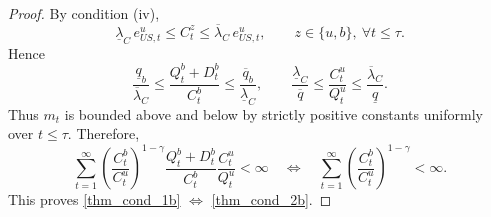 \documentclass[12pt]{article}
\theoremstyle{plain}
\begin{document}
\begin{proof}
By condition (iv),
\[
\underline\lambda_C\,e_{US,t}^u
\le
C_t^z
\le
\overline\lambda_C\,e_{US,t}^u,
\qquad z\in\{u,b\},\ \forall t\le\tau.
\]
Hence
\[
\frac{\underline q_b}{\overline\lambda_C}
\le
\frac{Q_t^b+D_t^b}{C_t^b}
\le
\frac{\overline q_b}{\underline\lambda_C},
\qquad
\frac{\underline\lambda_C}{\overline q}
\le
\frac{C_t^u}{Q_t^u}
\le
\frac{\overline\lambda_C}{\underline q}.
\]
Thus $m_t$ is bounded above and below by strictly positive constants uniformly over $t\le\tau$.
Therefore,
\[
\sum_{t=1}^\infty
\left(\frac{C_t^b}{C_t^u}\right)^{1-\gamma}
\frac{Q_t^b+D_t^b}{C_t^b}
\frac{C_t^u}{Q_t^u}
<\infty
\quad\Longleftrightarrow\quad
\sum_{t=1}^\infty
\left(\frac{C_t^b}{C_t^u}\right)^{1-\gamma}
<\infty.
\]
This proves \eqref{thm_cond_1b} $\Longleftrightarrow$ \eqref{thm_cond_2b}.
\end{proof}




\appendix


 
\end{document}
